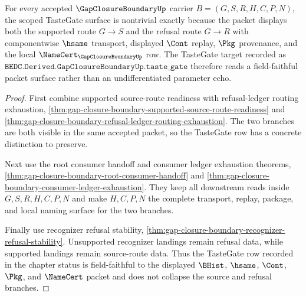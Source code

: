 \begin{theorem}
\label{thm:gap-closure-boundary-tastegate-scoped-nontriviality}
For every accepted $\GapClosureBoundaryUp$ carrier $B=(G,S,R,H,C,P,N)$, the scoped TasteGate surface is nontrivial exactly because the packet displays both the supported route $G \longrightarrow S$ and the refusal route $G \longrightarrow R$ with componentwise $\hsame$ transport, displayed $\Cont$ replay, $\Pkg$ provenance, and the local $\NameCert_{\GapClosureBoundaryUp}$ row. The TasteGate target recorded as $\texttt{BEDC.Derived.GapClosureBoundaryUp.taste\_gate}$ therefore reads a field-faithful packet surface rather than an undifferentiated parameter echo.
\end{theorem}
\begin{proof}
First combine supported source-route readiness with refusal-ledger routing exhaustion, \autoref{thm:gap-closure-boundary-supported-source-route-readiness} and \autoref{thm:gap-closure-boundary-refusal-ledger-routing-exhaustion}. The two branches are both visible in the same accepted packet, so the TasteGate row has a concrete distinction to preserve.

Next use the root consumer handoff and consumer ledger exhaustion theorems, \autoref{thm:gap-closure-boundary-root-consumer-handoff} and \autoref{thm:gap-closure-boundary-consumer-ledger-exhaustion}. They keep all downstream reads inside $G,S,R,H,C,P,N$ and make $H,C,P,N$ the complete transport, replay, package, and local naming surface for the two branches.

Finally use recognizer refusal stability, \autoref{thm:gap-closure-boundary-recognizer-refusal-stability}. Unsupported recognizer landings remain refusal data, while supported landings remain source-route data. Thus the TasteGate row recorded in the chapter status is field-faithful to the displayed $\BHist$, $\hsame$, $\Cont$, $\Pkg$, and $\NameCert$ packet and does not collapse the source and refusal branches.
\end{proof}

